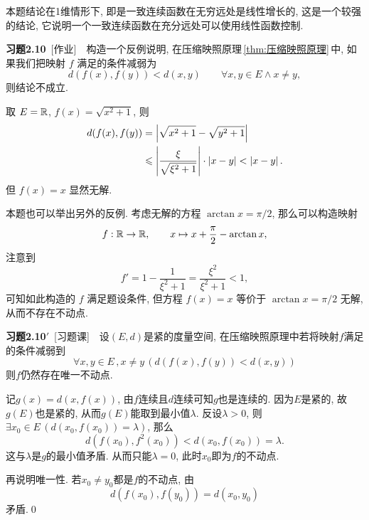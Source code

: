     \begin{Remark}
        本题结论在1维情形下, 即是一致连续函数在无穷远处是线性增长的, 这是一个较强的结论, 它说明一个一致连续函数在充分远处可以使用线性函数控制.
    \end{Remark}
    
    \textbf{习题2.10}\ [作业]\ \ 构造一个反例说明, 在压缩映照原理\,\ref{thm:压缩映照原理}\,中, 如果我们把映射 $ f $ 满足的条件减弱为
    \[
        d(f(x), f(y))<d(x, y)\qquad \forall x, y\in E\wedge x\neq y,
    \]
    则结论不成立.

    \begin{Solution}
        取 $ E=\mathbb{R} $, $ f(x)=\sqrt{x^{2}+1} $, 则
        \[
            \begin{aligned}
                d(f(x), f(y)) & =\left| \sqrt{x^{2}+1}-\sqrt{y^{2}+1} \right| \\
                & \leqslant\left| \frac{\xi}{\sqrt{\xi^{2}+1}} \right| \cdot\left| x-y \right| <\left| x-y \right| .
            \end{aligned}
        \]
        但 $ f(x)=x $ 显然无解.
    \end{Solution}
    \begin{Remark}
        本题也可以举出另外的反例. 考虑无解的方程 $ \arctan x=\pi/2 $, 那么可以构造映射
        \[
            f : \mathbb{R}\to\mathbb{R},\qquad x\mapsto x+\frac\pi 2-\arctan x,
        \]
        注意到
        \[
            f'=1-\frac{1}{\xi^2+1}=\frac{\xi^2}{\xi^2+1}<1,
        \]
        可知如此构造的 $ f $ 满足题设条件, 但方程 $ f(x)=x $ 等价于 $ \arctan x=\pi/2 $ 无解, 从而不存在不动点.
    \end{Remark}
    
    \textbf{习题2.10$\bm{'}$}\ [习题课]\ \ 设$ (E,d) $是紧的度量空间, 在压缩映照原理中若将映射$ f $满足的条件减弱到
    \[
    \forall x,y\in E\,,x\ne y\,(d(f(x),f(y))<d(x,y))
    \]
    则$ f $仍然存在唯一不动点.
    \begin{Proof}
    记$ g(x)=d(x,f(x)) $, 由$ f $连续且$ d $连续可知$ g $也是连续的. 因为$ E $是紧的, 故$ g(E) $也是紧的, 从而$ g(E) $能取到最小值$ \lambda $. 反设$ \lambda>0 $, 则$ \exists x_0\in E\,(d(x_0,f(x_0))=\lambda) $, 那么
    \[
    d(f(x_0),f^2(x_0))<d(x_0,f(x_0))=\lambda.
    \]
    这与$ \lambda $是$ g $的最小值矛盾. 从而只能$ \lambda=0 $, 此时$ x_0 $即为$ f $的不动点.
    
    再说明唯一性. 若$ x_0\ne y_0 $都是$ f $的不动点, 由
    \[
    d(f(x_0),f(y_0))=d(x_0,y_0)
    \]
    矛盾.\qed
    \end{Proof}
    
